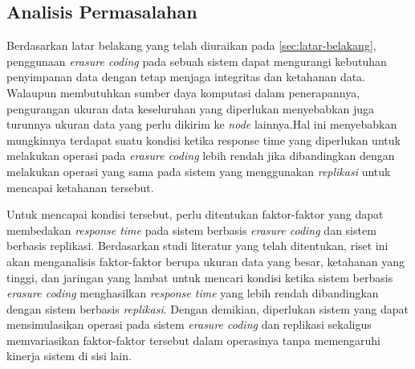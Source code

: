 \subsection{Analisis Permasalahan}
\label{sec:analisis-permasalahan}

Berdasarkan latar belakang yang telah diuraikan pada \ref{sec:latar-belakang}, penggunaan \textit{erasure coding} pada sebuah sistem dapat mengurangi kebutuhan penyimpanan data dengan tetap menjaga integritas dan ketahanan data. Walaupun membutuhkan sumber daya komputasi dalam penerapannya, pengurangan ukuran data keseluruhan yang diperlukan menyebabkan juga turunnya ukuran data yang perlu dikirim ke \textit{node} lainnya.Hal ini menyebabkan mungkinnya terdapat suatu kondisi ketika {response time} yang diperlukan untuk melakukan operasi pada \textit{erasure coding} lebih rendah jika dibandingkan dengan melakukan operasi yang sama pada sistem yang menggunakan \textit{replikasi} untuk mencapai ketahanan tersebut.

Untuk mencapai kondisi tersebut, perlu ditentukan faktor-faktor yang dapat membedakan \textit{response time} pada sistem berbasis \textit{erasure coding} dan sistem berbasis replikasi. Berdasarkan studi literatur yang telah ditentukan, riset ini akan menganalisis faktor-faktor berupa ukuran data yang besar, ketahanan yang tinggi, dan jaringan yang lambat untuk mencari kondisi ketika sistem berbasis \textit{erasure coding} menghasilkan \textit{response time} yang lebih rendah dibandingkan dengan sistem berbasis \textit{replikasi}. Dengan demikian, diperlukan sistem yang dapat mensimulasikan operasi pada sistem \textit{erasure coding} dan replikasi sekaligus memvariasikan faktor-faktor tersebut dalam operasinya tanpa memengaruhi kinerja sistem di sisi lain.
  